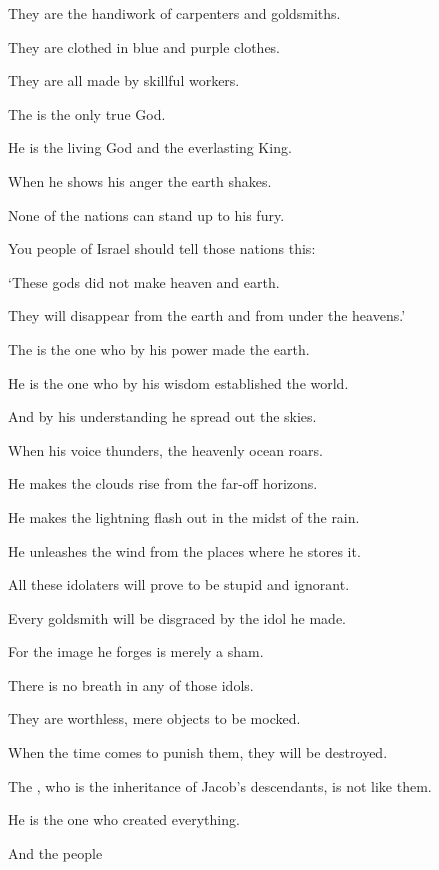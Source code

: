 {\par }{\Q They are the handiwork
of carpenters
and goldsmiths.
\par }{\Q They are clothed in blue
and purple
clothes.
\par }{\Q They are all
made
by skillful workers.
\par }{\Q {}The
{}
is the only true
God.
\par }{\Q He
is the living
God
and the everlasting
King.
\par }{\Q When he shows his anger
the earth
shakes.
\par }{\Q None of the nations
can stand up to his fury.
\par }{\Q {}You people of Israel should tell
those nations this:
\par }{\Q ‘These
gods
did not
make
heaven
and earth.
\par }{\Q They will disappear
from the earth
and from
under
the heavens.’
\par }{\Q {}The
{} is the one who by his power
made
the earth.
\par }{\Q He is the one who by his wisdom
established
the world.
\par }{\Q And by his understanding
he spread
out the skies.
\par }{\Q {}When his voice
thunders,
the heavenly
ocean
roars.
\par }{\Q He makes the clouds rise from
the far-off horizons.
\par }{\Q He
makes the lightning
flash out
in the midst of the rain.
\par }{\Q He unleashes
the wind
from the
places where he stores it.
\par }{\Q {}All
these idolaters
will prove to be stupid and ignorant.
\par }{\Q Every
goldsmith
will be disgraced
by the idol
he made.
\par }{\Q For
the image
he forges is merely a sham.
\par }{\Q There is no
breath in any of those idols.
\par }{\Q {}They
are worthless,
mere objects
to be mocked.
\par }{\Q When the time
comes to punish
them, they will be destroyed.
\par }{\Q {}The
{}, who is the inheritance
of Jacob’s
descendants, is not
like them.
\par }{\Q He is the one who created
everything.
\par }{\Q And the people
}
